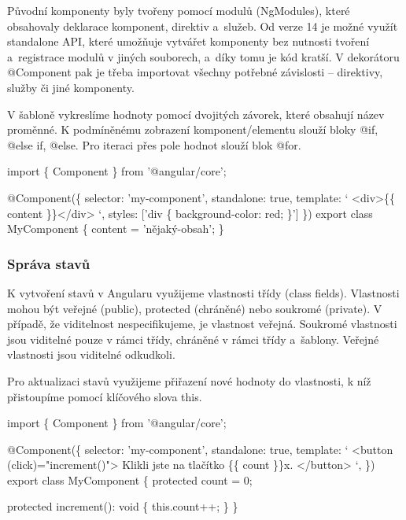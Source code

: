 Původní komponenty byly tvořeny pomocí modulů (NgModules), které obsahovaly deklarace komponent, direktiv a~služeb. 
Od verze 14 je možné využít standalone API, které umožňuje vytvářet komponenty bez nutnosti tvoření a~registrace modulů v jiných souborech, a~díky tomu je kód kratší. 
V dekorátoru @Component pak je třeba importovat všechny potřebné závislosti -- direktivy, služby či jiné komponenty.\cite{angulardev,learningangular}

V šabloně vykreslíme hodnoty pomocí dvojitých závorek, které obsahují název proměnné. K podmíněnému zobrazení komponent/elementu slouží bloky @if, @else if, @else. 
Pro iteraci přes pole hodnot slouží blok @for.\cite{angulardev}

\begin{prog}
import \{ Component \} from '@angular/core';

@Component(\{
  selector: 'my-component',
  standalone: true,
  template: `
    <div>\{\{ content \}\}</div>
  `,
  styles: ['div \{ background-color: red; \}']
\})
export class MyComponent \{
  content = 'nějaký-obsah';
\}
\end{prog}

\subsubsection{Správa stavů}

K vytvoření stavů v Angularu využijeme vlastnosti třídy (class fields). Vlastnosti mohou být veřejné (public), protected (chráněné) nebo soukromé (private). 
V případě, že viditelnost nespecifikujeme, je vlastnost veřejná. Soukromé vlastnosti jsou viditelné pouze v rámci třídy, chráněné v rámci třídy a~šablony. 
Veřejné vlastnosti jsou viditelné odkudkoli.\cite{angulardev,learningangular}

Pro aktualizaci stavů využijeme přiřazení nové hodnoty do vlastnosti, k níž přistoupíme pomocí klíčového slova this.\cite{angulardev}

\begin{prog}
import \{ Component \} from '@angular/core';

@Component(\{
  selector: 'my-component',
  standalone: true,
  template: `
    <button (click)="increment()">
      Klikli jste na tlačítko \{\{ count \}\}x.
    </button>
  `,
\})
export class MyComponent \{
  protected count = 0;

  protected increment(): void \{
    this.count++;
  \}
\}
\end{prog}


